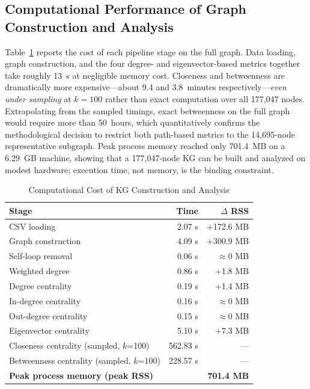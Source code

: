 \documentclass[conference]{IEEEtran}
\begin{document}
\subsection{Computational Performance of Graph Construction and Analysis}

Table~\ref{tab:bench} reports the cost of each pipeline stage on the full graph.
Data loading, graph construction, and the four degree- and eigenvector-based
metrics together take roughly 13~s at negligible memory cost. Closeness and
betweenness are dramatically more expensive---about 9.4 and 3.8~minutes
respectively---\emph{even under sampling} at $k=100$ rather than exact computation
over all 177{,}047 nodes. Extrapolating from the sampled timings, exact
betweenness on the full graph would require more than 50~hours, which quantitatively
confirms the methodological decision to restrict both path-based metrics to the
14{,}695-node representative subgraph. Peak process memory reached only 701.4~MB
on a 6.29~GB machine, showing that a 177{,}047-node KG can be built and analyzed
on modest hardware; execution time, not memory, is the binding constraint.

\begin{table}[!t]
\caption{Computational Cost of KG Construction and Analysis}
\label{tab:bench}
\centering
\renewcommand{\arraystretch}{1.25}
\begin{tabular}{lrr}
\toprule
Stage & Time & $\Delta$ RSS \\
\midrule
CSV loading                          & 2.07 s   & $+$172.6 MB \\
Graph construction                   & 4.09 s   & $+$300.9 MB \\
Self-loop removal                    & 0.06 s   & $\approx$0 MB \\
Weighted degree                      & 0.86 s   & $+$1.8 MB \\
Degree centrality                    & 0.19 s   & $+$1.4 MB \\
In-degree centrality                 & 0.16 s   & $\approx$0 MB \\
Out-degree centrality                & 0.15 s   & $\approx$0 MB \\
Eigenvector centrality               & 5.10 s   & $+$7.3 MB \\
Closeness centrality (sampled, $k$=100)   & 562.83 s & --- \\
Betweenness centrality (sampled, $k$=100) & 228.57 s & --- \\
\midrule
\multicolumn{2}{l}{\textbf{Peak process memory (peak RSS)}} & \textbf{701.4 MB} \\
\bottomrule
\end{tabular}
\end{table}
\end{document}

